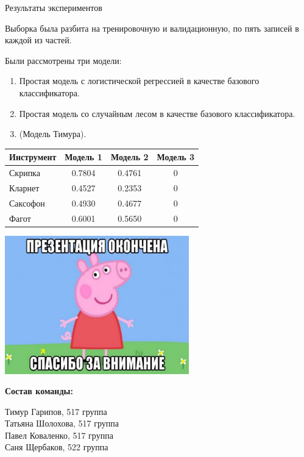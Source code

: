 \documentclass[unicode, dvipsnames]{beamer}
\begin{document}
\begin{frame}{Результаты экспериментов}

Выборка была разбита на тренировочную и валидационную, по пять записей в каждой из частей.

\bigskip
Были рассмотрены три модели: 
\begin{enumerate}
	\item Простая модель с логистической регрессией в качестве базового классификатора.
	\item Простая модель со случайным лесом в качестве базового классификатора.
	\item (Модель Тимура).
\end{enumerate}

\bigskip
\centering
\begin{tabular}{|l|c|c|c|}
	\hline
	Инструмент & Модель 1 & Модель 2 & Модель 3 \\
	\hline
	Скрипка & 0.7804 & 0.4761 & 0 \\
	\hline
	Кларнет & 0.4527 & 0.2353 & 0 \\
	\hline
	Саксофон & 0.4930 & 0.4677 & 0 \\
	\hline
	Фагот & 0.6001 & 0.5650 & 0 \\
	\hline
\end{tabular}

\end{frame}

\begin{frame}{}

\centering
\includegraphics[width=0.6\textwidth]{graphics/final.jpg}

\bigskip
\textbf{Состав команды:}

Тимур Гарипов, 517 группа \\ Татьяна Шолохова, 517 группа \\ Павел Коваленко, 517 группа \\ Саня Щербаков, 522 группа

\end{frame}
\end{document}
